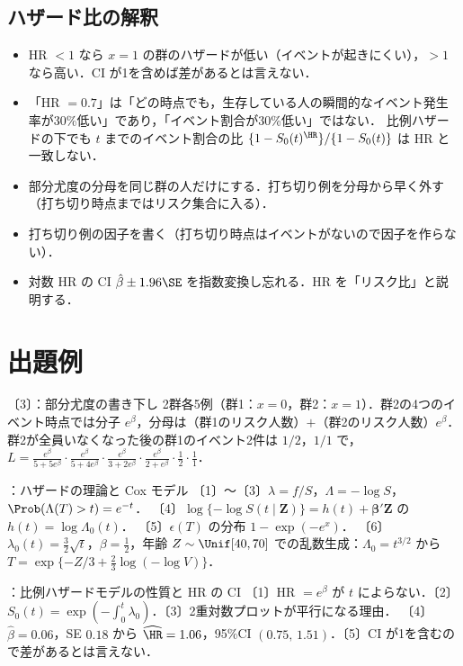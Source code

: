 \subsection{ハザード比の解釈}
\begin{itemize}
\item HR $<1$ なら $x=1$ の群のハザードが低い（イベントが起きにくい），$>1$ なら高い．CI が1を含めば差があるとは言えない．
\item 「HR $=0.7$」は「どの時点でも，生存している人の瞬間的なイベント発生率が30\%低い」であり，「イベント割合が30\%低い」ではない．
      比例ハザードの下でも $t$ までのイベント割合の比 $\{1-S_0(t)^{\HR}\}/\{1-S_0(t)\}$ は HR と一致しない．
\end{itemize}

\begin{warnbox}
\begin{itemize}
\item 部分尤度の分母を同じ群の人だけにする．打ち切り例を分母から早く外す（打ち切り時点まではリスク集合に入る）．
\item 打ち切り例の因子を書く（打ち切り時点はイベントがないので因子を作らない）．
\item 対数 HR の CI $\hat\beta\pm1.96\SE$ を指数変換し忘れる．HR を「リスク比」と説明する．
\end{itemize}
\end{warnbox}

\section{出題例}\label{sec:m03-shutsudai}
\begin{shutsudai}{〔3〕：部分尤度の書き下し}
2群各5例（群1：$x=0$，群2：$x=1$）．群2の4つのイベント時点では分子 $e^\beta$，分母は（群1のリスク人数）$+$（群2のリスク人数）$e^\beta$．
群2が全員いなくなった後の群1のイベント2件は $1/2$，$1/1$ で，
$L=\frac{e^\beta}{5+5e^\beta}\cdot\frac{e^\beta}{5+4e^\beta}\cdot\frac{e^\beta}{3+2e^\beta}\cdot\frac{e^\beta}{2+e^\beta}\cdot\frac12\cdot\frac11$．
\end{shutsudai}
\begin{shutsudai}{：ハザードの理論と Cox モデル}
〔1〕〜〔3〕$\lambda=f/S$，$\Lambda=-\log S$，$\Prob(\Lambda(T)>t)=e^{-t}$．
〔4〕$\log\{-\log S(t\mid\bm Z)\}=h(t)+\bm\beta'\bm Z$ の $h(t)=\log\Lambda_0(t)$．
〔5〕$\epsilon(T)$ の分布 $1-\exp(-e^x)$．
〔6〕$\lambda_0(t)=\frac32\sqrt t$，$\beta=\frac12$，年齢 $Z\sim\Unif[40,70]$ での乱数生成：$\Lambda_0=t^{3/2}$ から $T=\exp\{-Z/3+\frac23\log(-\log V)\}$．
\end{shutsudai}
\begin{shutsudai}{：比例ハザードモデルの性質と HR の CI}
〔1〕HR $=e^\beta$ が $t$ によらない．〔2〕$S_0(t)=\exp(-\int_0^t\lambda_0)$．〔3〕2重対数プロットが平行になる理由．
〔4〕$\hat\beta=0.06$，SE $0.18$ から $\widehat{\HR}=1.06$，95\%CI $(0.75,\,1.51)$．〔5〕CI が1を含むので差があるとは言えない．
\end{shutsudai}

